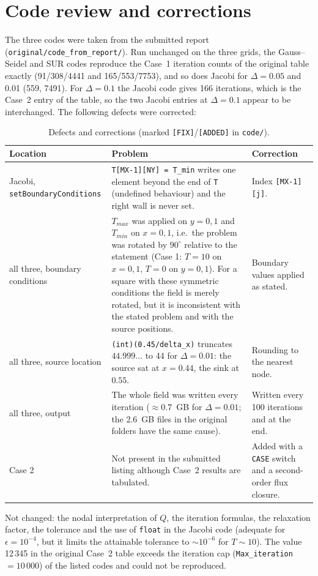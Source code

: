 \section{Code review and corrections}
The three codes were taken from the submitted report (\texttt{original/code\_from\_report/}). Run unchanged on the three grids, the Gauss--Seidel and SUR codes reproduce the Case~1 iteration counts of the original table exactly (91/308/4441 and 165/553/7753), and so does Jacobi for $\Delta=0.05$ and 0.01 (559, 7491). For $\Delta=0.1$ the Jacobi code gives 166 iterations, which is the Case~2 entry of the table, so the two Jacobi entries at $\Delta=0.1$ appear to be interchanged. The following defects were corrected:
\begin{table}[H]\centering\small
\begin{tabular}{p{3.6cm}p{7.0cm}p{4.4cm}}\toprule
Location & Problem & Correction\\\midrule
Jacobi, \texttt{setBoundaryConditions} & \texttt{T[MX-1][NY] = T\_min} writes one element beyond the end of \texttt{T} (undefined behaviour) and the right wall is never set. & Index \texttt{[MX-1][j]}.\\
all three, boundary conditions & $T_{max}$ was applied on $y=0,1$ and $T_{min}$ on $x=0,1$, i.e.\ the problem was rotated by $90^\circ$ relative to the statement (Case 1: $T=10$ on $x=0,1$, $T=0$ on $y=0,1$). For a square with these symmetric conditions the field is merely rotated, but it is inconsistent with the stated problem and with the source positions. & Boundary values applied as stated.\\
all three, source location & \texttt{(int)(0.45/delta\_x)} truncates $44.999\ldots$ to 44 for $\Delta=0.01$: the source sat at $x=0.44$, the sink at $0.55$. & Rounding to the nearest node.\\
all three, output & The whole field was written every iteration ($\approx0.7$~GB for $\Delta=0.01$; the 2.6~GB files in the original folders have the same cause). & Written every 100 iterations and at the end.\\
Case 2 & Not present in the submitted listing although Case~2 results are tabulated. & Added with a \texttt{CASE} switch and a second-order flux closure.\\\bottomrule
\end{tabular}\caption{Defects and corrections (marked \texttt{[FIX]}/\texttt{[ADDED]} in \texttt{code/}).}\end{table}
Not changed: the nodal interpretation of $Q$, the iteration formulas, the relaxation factor, the tolerance and the use of \texttt{float} in the Jacobi code (adequate for $\epsilon=10^{-4}$, but it limits the attainable tolerance to $\sim10^{-6}$ for $T\sim10$). The value 12\,345 in the original Case~2 table exceeds the iteration cap (\texttt{Max\_iteration} $=10\,000$) of the listed codes and could not be reproduced.


